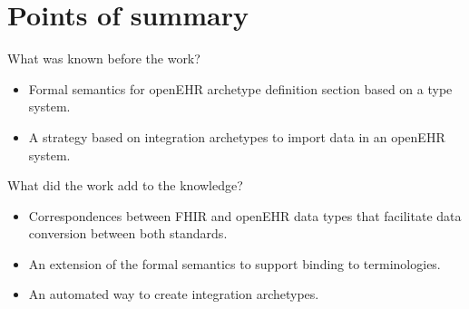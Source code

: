 \section*{Points of summary}

What was known before the work?

\begin{itemize}
  \item Formal semantics for openEHR archetype definition section based on a type system.
  \item A strategy based on integration archetypes to import data in an openEHR system.
\end{itemize}

What did the work add to the knowledge?

\begin{itemize}
  \item Correspondences between FHIR and openEHR data types that facilitate data conversion between both standards.
  \item An extension of the formal semantics to support binding to terminologies.
  \item An automated way to create integration archetypes.
\end{itemize}
